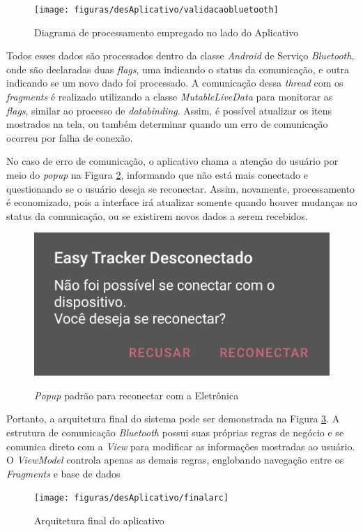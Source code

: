 \begin{figure}[!htb]
	\centering
	\caption{Diagrama de processamento empregado no lado do Aplicativo}
	\texttt{[image: figuras/desAplicativo/validacaobluetooth]}
	\label{fig:validacaobluetooth}
\end{figure}

Todos esses dados são processados dentro da classe \textit{Android} de Serviço \textit{Bluetooth}, onde são declaradas duas \textit{flags}, uma indicando o status da comunicação, e outra indicando se um novo dado foi processado. A comunicação dessa \textit{thread} com os \textit{fragments} é realizado utilizando a classe \textit{MutableLiveData} para monitorar as \textit{flags}, similar ao processo de \textit{databinding}. Assim, é possível atualizar os itens mostrados na tela, ou também determinar quando um erro de comunicação ocorreu por falha de conexão. 

No caso de erro de comunicação, o aplicativo chama a atenção do usuário por meio do \textit{popup} na Figura \ref{fig:popupreconect}, informando que não está mais conectado e questionando se o usuário deseja se reconectar. Assim, novamente, processamento é economizado, pois a interface irá atualizar somente quando houver mudanças no status da comunicação, ou se existirem novos dados a serem recebidos.

\begin{figure}[!htb]
	\centering
	\caption{\textit{Popup} padrão para reconectar com a Eletrônica}
	\includegraphics[width=0.4\linewidth]{figuras/desAplicativo/popupreconect}
	\label{fig:popupreconect}
\end{figure}

Portanto, a arquitetura final do sistema pode ser demonstrada na Figura \ref{fig:finalarc}. A estrutura de comunicação \textit{Bluetooth} possui suas próprias regras de negócio e se comunica direto com a \textit{View} para modificar as informações mostradas ao usuário. O \textit{ViewModel} controla apenas as demais regras, englobando navegação entre os \textit{Fragments} e base de dados

\begin{figure}[!htb]
	\centering
	\caption{Arquitetura final do aplicativo}
	\texttt{[image: figuras/desAplicativo/finalarc]}
	\label{fig:finalarc}
\end{figure}

